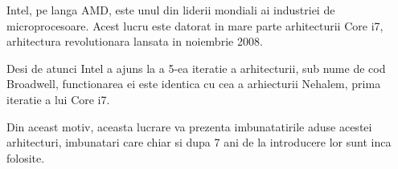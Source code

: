 Intel, pe langa AMD, este unul din liderii mondiali ai industriei de microprocesoare. Acest lucru
este datorat in mare parte arhitecturii Core i7, arhitectura revolutionara lansata in noiembrie
2008.

Desi de atunci Intel a ajuns la a 5-ea iteratie a arhitecturii, sub nume de cod Broadwell, functionarea
 ei este identica cu cea a arhiecturii Nehalem, prima iteratie a lui Core i7.

Din aceast motiv, aceasta lucrare va prezenta imbunatatirile aduse acestei arhitecturi, imbunatari care
chiar si dupa 7 ani de la introducere lor sunt inca folosite.

